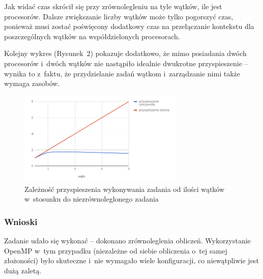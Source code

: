 \documentclass[a4paper,12pt]{article}
\begin{document}
Jak widać czas skrócił się przy zrównolegleniu na tyle wątków, ile jest procesorów. Dalsze zwiększanie liczby wątków może tylko pogorszyć czas, ponieważ musi zostać poświęcony dodatkowy czas na przełączanie kontekstu dla poszczególnych wątków na współdzielonych procesorach.

Kolejny wykres (Rysunek~2) pokazuje dodatkowo, że mimo posiadania dwóch procesorów i~dwóch wątków nie nastąpiło idealnie dwukrotne przyspieszenie -- wynika to z~faktu, że przydzielanie zadań wątkom i~zarządzanie nimi także wymaga zasobów.

\begin{figure}[!hbtp]
  \centering
  \includegraphics[width=0.7\textwidth]{wykres2_zad1}
  \caption{Zależność przyspieszenia wykonywania zadania od ilości wątków w~stosunku do niezrównoleglonego zadania}
\end{figure}

\subsubsection*{Wnioski }
Zadanie udało się wykonać -- dokonano zrównoleglenia obliczeń. Wykorzystanie OpenMP w~tym przypadku (niezależne od siebie obliczenia o~tej samej złożoności) było skuteczne i~nie wymagało wiele konfiguracji, co niewątpliwie jest dużą zaletą.
\end{document}
